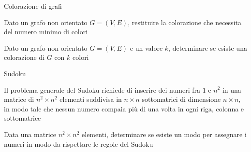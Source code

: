 \begin{frame}{Colorazione di grafi}

\vspace{-9pt}
\begin{myboxtitle}
Dato un grafo non orientato $G=(V,E)$, restituire la colorazione che necessita del numero minimo di colori
\end{myboxtitle}

\begin{myboxtitle}
Dato un grafo non orientato $G=(V,E)$ e un valore $k$, determinare se esiste
una colorazione di $G$ con $k$ colori
\end{myboxtitle}

\end{frame}

\begin{frame}{Sudoku}

\vspace{-9pt}
\begin{myboxtitle}
Il problema generale del \alert{Sudoku} richiede di inserire dei numeri
fra $1$ e $n^2$ in una matrice di $n^2 \times n^2$ elementi 
suddivisa in $n \times n$ sottomatrici di dimensione $n \times n$, 
in modo tale che nessun  numero compaia più di una volta in ogni 
riga, colonna e sottomatrice
\end{myboxtitle}

\begin{myboxtitle}
Data una matrice $n^2 \times n^2$ elementi, determinare se esiste un modo per assegnare i numeri in modo da rispettare le regole del Sudoku
\end{myboxtitle}

\end{frame}


